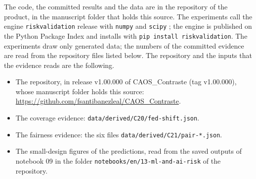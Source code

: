 The code, the committed results and the data are in the repository of the product, in the manuscript folder that holds this source. The experiments call the engine \texttt{riskvalidation} release \EnvEngine{} with \texttt{numpy} \EnvNumpy{} and \texttt{scipy} \EnvScipy{}; the engine is published on the Python Package Index and installs with \texttt{pip install riskvalidation}. The experiments draw only generated data; the numbers of the committed evidence are read from the repository files listed below. The repository and the inputs that the evidence reads are the following.
\begin{itemize}
\item The repository, in release v1.00.000 of CAOS\_Contraste (tag v1.00.000), whose manuscript folder holds this source: \url{https://github.com/fsantibanezleal/CAOS_Contraste}. %
\item The coverage evidence: \texttt{data/derived/C20/fed-shift.json}.
\item The fairness evidence: the six files \texttt{data/derived/C21/pair-*.json}.
\item The small-design figures of the predictions, read from the saved outputs of notebook 09 in the folder \texttt{notebooks/en/13-ml-and-ai-risk} of the repository.
\end{itemize}

